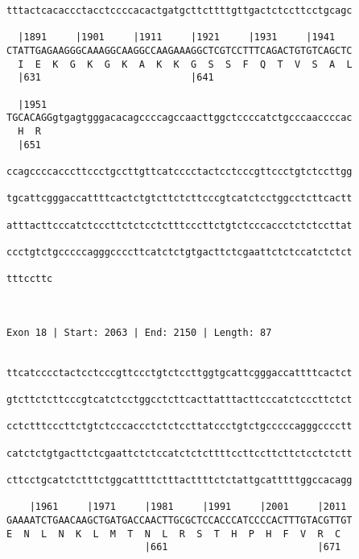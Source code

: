 \documentclass{article}
\begin{document}
\begin{Verbatim}
tttactcacaccctacctccccacactgatgcttcttttgttgactctccttcctgcagc
                                                            
  |1891     |1901     |1911     |1921     |1931     |1941   
CTATTGAGAAGGGCAAAGGCAAGGCCAAGAAAGGCTCGTCCTTTCAGACTGTGTCAGCTC
  I  E  K  G  K  G  K  A  K  K  G  S  S  F  Q  T  V  S  A  L
  |631                          |641                        
  
  |1951                                                     
TGCACAGGgtgagtgggacacagccccagccaacttggctccccatctgcccaaccccac
  H  R                                                      
  |651                                                      
  
ccagccccacccttccctgccttgttcatcccctactcctcccgttccctgtctccttgg
                                                            
tgcattcgggaccattttcactctgtcttctcttcccgtcatctcctggcctcttcactt
                                                            
atttacttcccatctcccttctctcctctttcccttctgtctcccaccctctctccttat
                                                            
ccctgtctgcccccagggccccttcatctctgtgacttctcgaattctctccatctctct
                                                            
tttccttc
        
        
 
Exon 18 | Start: 2063 | End: 2150 | Length: 87


ttcatcccctactcctcccgttccctgtctccttggtgcattcgggaccattttcactct
                                                            
gtcttctcttcccgtcatctcctggcctcttcacttatttacttcccatctcccttctct
                                                            
cctctttcccttctgtctcccaccctctctccttatccctgtctgcccccagggcccctt
                                                            
catctctgtgacttctcgaattctctccatctctcttttccttccttcttctcctctctt
                                                            
cttcctgcatctctttctggcattttctttacttttctctattgcatttttggccacagg
                                                            
    |1961     |1971     |1981     |1991     |2001     |2011 
GAAAATCTGAACAAGCTGATGACCAACTTGCGCTCCACCCATCCCCACTTTGTACGTTGT
E  N  L  N  K  L  M  T  N  L  R  S  T  H  P  H  F  V  R  C  
                        |661                          |671  
  

\end{Verbatim}
\end{document}
